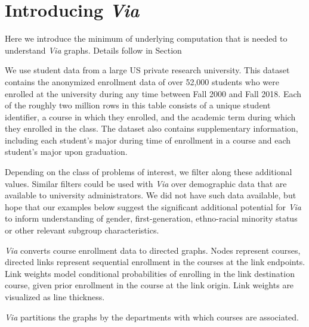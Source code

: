 \section{Introducing \em{Via}}
\label{sec:viaIntro}

Here we introduce the minimum of underlying computation that is needed
to understand {\em Via} graphs. Details follow in
Section~

We use student data from a large US private research university. This
dataset contains the anonymized enrollment data of over 52,000
students who were enrolled at the university during any time between
Fall 2000 and Fall 2018. Each of the roughly two million rows in this
table consists of a unique student identifier, a course in which they
enrolled, and the academic term during which they enrolled in the
class. The dataset also contains supplementary information, including
each student's major during time of enrollment in a course and each
student's major upon graduation.

Depending on the class of problems of interest, we filter along these
additional values. Similar filters could be used with {\em Via} over
demographic data that are available to university administrators. We
did not have such data available, but hope that our examples below
suggest the significant additional potential for {\em Via} to inform
understanding of gender, first-generation, ethno-racial minority status or other relevant subgroup characteristics.

{\em Via} converts course enrollment data to directed graphs.
Nodes represent courses, directed links represent sequential
enrollment in the courses at the link endpoints. Link weights model
conditional probabilities of enrolling in the link destination course,
given prior enrollment in the course at the link origin. Link weights
are visualized as line thickness.

{\em Via} partitions the graphs by the departments with which courses
are associated. 

